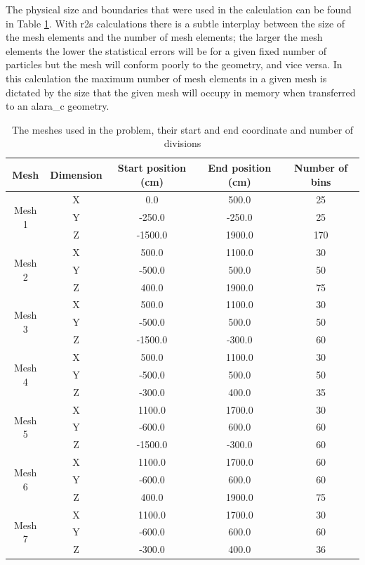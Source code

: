 \documentclass[12pt]{article}
\begin{document}
The physical size and boundaries that were used in the calculation
can be found in Table \ref{table:mesh_sizes}. With \gls{r2s} calculations there 
is a subtle interplay between the size of the mesh elements and the number of mesh
elements; the larger the mesh elements the lower the statistical errors will be
for a given fixed number of particles but the mesh will conform poorly to the
geometry, and vice versa. In this calculation the maximum number of mesh
elements in a given mesh is dictated by the size that the given mesh will
occupy in memory when transferred to an \gls{alara_c} geometry. 

\begin{centering}
 \begin{table}[ht!]
  \begin{tabular}{c | c | c | c | c}
  \hline 
  Mesh & Dimension & Start position (cm) & End position (cm) & Number of bins\\
  \hline 
  \multirow{3}{*}{Mesh 1} & X & 0.0 & 500.0 & 25 \\ & Y & -250.0 & -250.0 & 25 \\
  & Z & -1500.0 & 1900.0 & 170 \\
  \hline
  \multirow{3}{*}{Mesh 2} & X & 500.0 & 1100.0 & 30 \\ & Y & -500.0 & 500.0 & 50\\
  & Z & 400.0 & 1900.0 & 75 \\
  \hline
  \multirow{3}{*}{Mesh 3} & X & 500.0 & 1100.0 & 30 \\ & Y & -500.0 & 500.0 & 50 \\
  & Z & -1500.0 & -300.0 & 60 \\
  \hline
  \multirow{3}{*}{Mesh 4} & X & 500.0 & 1100.0 & 30 \\ & Y & -500.0 & 500.0 & 50 \\
  & Z & -300.0 & 400.0 & 35 \\
  \hline
  \multirow{3}{*}{Mesh 5} & X & 1100.0 & 1700.0 & 30 \\ & Y & -600.0 & 600.0 & 60 \\
  & Z & -1500.0 & -300.0 & 60 \\
  \hline
  \multirow{3}{*}{Mesh 6} & X & 1100.0 & 1700.0 & 60 \\ & Y & -600.0 & 600.0 & 60 \\
  & Z & 400.0 & 1900.0 & 75\\
  \hline
  \multirow{3}{*}{Mesh 7} & X & 1100.0 & 1700.0 & 30 \\ & Y & -600.0 & 600.0 & 60 \\
  & Z & -300.0 & 400.0 & 36 
  \end{tabular}
 \caption{The meshes used in the problem, their start and end coordinate and
          number of divisions}
 \label{table:mesh_sizes}
 \end{table}
\end{centering}
\end{document}
